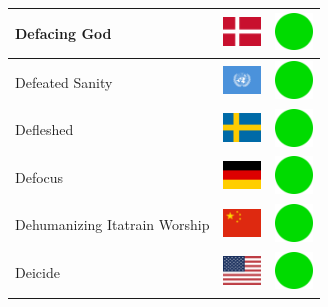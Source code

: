 \documentclass[12pt, a4paper, twoside]{report}
\begin{document}
\begin{center}
\begin{longtable}{|p{5cm}|p{2cm}|p{2cm}|}
 Defacing God                                               & \includegraphics[width=1cm]{../img/flags/dk} &   \includegraphics[width=1cm]{../likes/y} \\ \hline
 Defeated Sanity                                            & \includegraphics[width=1cm]{../img/flags/un} &   \includegraphics[width=1cm]{../likes/y} \\ \hline
 Defleshed                                                  & \includegraphics[width=1cm]{../img/flags/se} &   \includegraphics[width=1cm]{../likes/y} \\ \hline
 Defocus                                                    & \includegraphics[width=1cm]{../img/flags/de} &   \includegraphics[width=1cm]{../likes/y} \\ \hline
 Dehumanizing Itatrain Worship                              & \includegraphics[width=1cm]{../img/flags/cn} &   \includegraphics[width=1cm]{../likes/y} \\ \hline
 Deicide                                                    & \includegraphics[width=1cm]{../img/flags/us} &   \includegraphics[width=1cm]{../likes/y} \\ \hline

\end{longtable}
\end{center}
\end{document}
